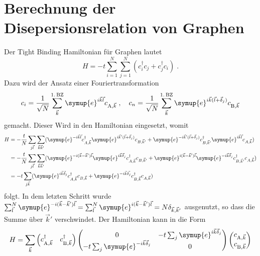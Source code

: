 \section{Berechnung der Disepersionsrelation von Graphen}
\label{sec:calc_dispersion}
Der Tight Binding Hamiltonian für Graphen lautet
\begin{equation*}
   H= - t \sum_{i=1}^N \sum_{j=1}^N\left ( c_i^\dagger c_j + c_j^\dagger c_i \right ) \; .
\end{equation*}
Dazu wird der Ansatz einer Fouriertransformation 
\begin{equation*}
    c_i = \frac{1}{\sqrt{N}} \sum_{\vec{k}}^{1. \, \text{BZ}} \symup{e}^{i\vec{k}\vec{l}} c_{\text{A}, \vec{k}} \; , 
    \quad c_n = \frac{1}{\sqrt{N}} \sum_{\vec{k}}^{1. \, \text{BZ}} \symup{e}^{i\vec{k}(\vec{l}+\vec{\delta}_j)} c_{\text{B}, \vec{k}}
\end{equation*}
gemacht. 
Dieser Wird in den Hamiltonian eingesetzt, womit 
\begin{align*}
    H &= -\frac{t}{N} \sum_{j\vec{l}} \sum_{\vec{k}\vec{k}'} ( \symup{e}^{-i\vec{k}\vec{l}}c^\dagger_{A,\vec{k}} 
    \symup{e}^{i\vec{k}'(\vec{l}+\vec{\delta}_j)}c_{B,\vec{k}'} + \symup{e}^{-i\vec{k}'(\vec{l}+\vec{\delta}_j)} c^\dagger_{B,\vec{k}'} 
    \symup{e}^{i\vec{k}\vec{l}}c_{A,\vec{k}}) \\
    &= -\frac{t}{N} \sum_{j\vec{l}} \sum_{\vec{k}\vec{k}'} ( \symup{e}^{-i(\vec{k}- \vec{k}')\vec{l}}\symup{e}^{i\vec{k}\vec{\delta}_j}c^\dagger_{A,\vec{k}} c_{B,\vec{k}'} + 
    \symup{e}^{i(\vec{k}- \vec{k}')\vec{l}} \symup{e}^{-i\vec{k}\vec{\delta}_j} c^\dagger_{B,\vec{k}'}c_{A,\vec{k}}) \\
    &= -t \sum_{j\vec{k}} ( \symup{e}^{i\vec{k}\vec{\delta}_j}c^\dagger_{A,\vec{k}} c_{B,\vec{k}} + 
    \symup{e}^{-i\vec{k}\vec{\delta_j}} c^\dagger_{B,\vec{k}}c_{A,\vec{k}})
\end{align*}
folgt.
In dem letzten Schritt wurde $\sum_{\vec{l}}^N \symup{e}^{-i(\vec{k}- \vec{k}')\vec{l}} 
= \sum_{\vec{l}}^N \symup{e}^{i(\vec{k}- \vec{k}')\vec{l}} = N\delta_{\vec{k}, \vec{k}'}$ ausgenutzt, so dass die Summe über $\vec{k}'$ verschwindet.
Der Hamiltonian kann in die Form 
\begin{equation*}
    H = \sum_{\vec{k}} \begin{pmatrix}
        c_{\text{A},\vec{k}}^{\dagger} & c_{\text{B},\vec{k}}^{\dagger}
    \end{pmatrix}
    \begin{pmatrix}
        0 & -t\sum_{j} \symup{e}^{i\vec{k}\vec{\delta}_j}     \\
        -t\sum_{j} \symup{e}^{-i\vec{k}\vec{\delta}_j} & 0     
    \end{pmatrix}
    \begin{pmatrix}
        c_{\text{A},\vec{k}} \\
        c_{\text{B},\vec{k}}
    \end{pmatrix}
\end{equation*}
